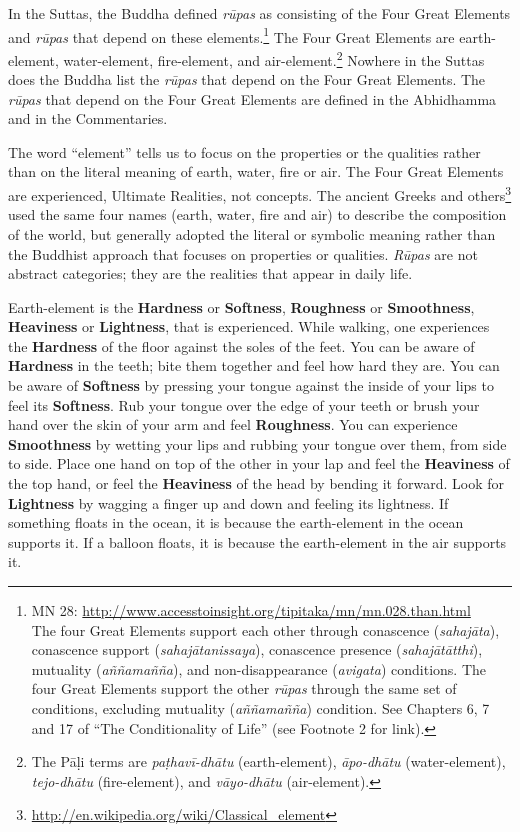 In the Suttas, the Buddha defined \textit{rūpas} as consisting of the Four Great Elements and \textit{rūpas} that depend on these elements.\footnote{MN 28: \url{http://www.accesstoinsight.org/tipitaka/mn/mn.028.than.html}\\ The four Great Elements support each other through conascence (\textit{sahajāta}), conascence support (\textit{sahajātanissaya}), conascence presence (\textit{sahajātātthi}), mutuality (\textit{\textit{aññamañña}}), and non-disappearance (\textit{avigata}) conditions. The four Great Elements support the other \textit{rūpas} through the same set of conditions, excluding mutuality (\textit{\textit{aññamañña}}) condition. See Chapters 6, 7 and 17 of “The Conditionality of Life” (see Footnote 2 for link).} The Four Great Elements are earth-element, water-element, fire-element, and air-element.\footnote{The Pāḷi terms are \textit{paṭhavī-dhātu} (earth-element), \textit{āpo-dhātu} (water-element), \textit{tejo-dhātu} (fire-element), and \textit{vāyo-dhātu} (air-element).} Nowhere in the Suttas does the Buddha list the \textit{rūpas} that depend on the Four Great Elements. The \textit{rūpas} that depend on the Four Great Elements are defined in the Abhidhamma and in the Commentaries.

The word “element” tells us to focus on the properties or the qualities rather than on the literal meaning of earth, water, fire or air. The Four Great Elements are experienced, Ultimate Realities, not concepts. The ancient Greeks and others\footnote{\url{http://en.wikipedia.org/wiki/Classical_element}} used the same four names (earth, water, fire and air) to describe the composition of the world, but generally adopted the literal or symbolic meaning rather than the Buddhist approach that focuses on properties or qualities. \textit{Rūpas} are not abstract categories; they are the realities that appear in daily life.

\pagebreak

Earth-element is the \textbf{Hardness} or \textbf{Softness}, \textbf{Roughness} or \textbf{Smoothness}, \textbf{Heaviness} or \textbf{Lightness}, that is experienced. While walking, one experiences the \textbf{Hardness} of the floor against the soles of the feet. You can be aware of \textbf{Hardness} in the teeth; bite them together and feel how hard they are. You can be aware of \textbf{Softness} by pressing your tongue against the inside of your lips to feel its \textbf{Softness}. Rub your tongue over the edge of your teeth or brush your hand over the skin of your arm and feel \textbf{Roughness}. You can experience \textbf{Smoothness} by wetting your lips and rubbing your tongue over them, from side to side. Place one hand on top of the other in your lap and feel the \textbf{Heaviness} of the top hand, or feel the \textbf{Heaviness} of the head by bending it forward. Look for \textbf{Lightness} by wagging a finger up and down and feeling its lightness. If something floats in the ocean, it is because the earth-element in the ocean supports it. If a balloon floats, it is because the earth-element in the air supports it.

